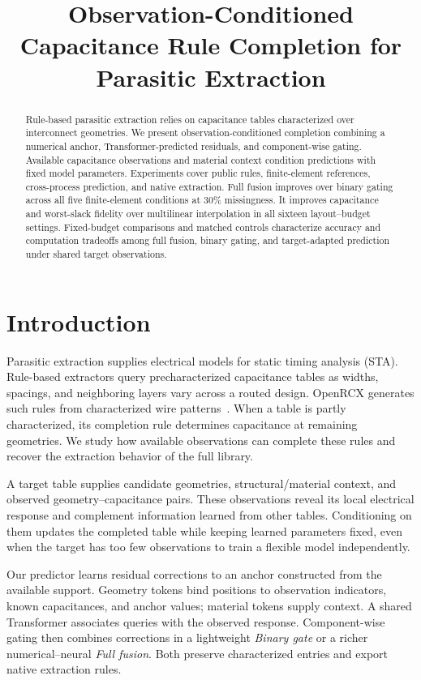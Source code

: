 \documentclass[conference,10pt,letterpaper]{IEEEtran}
\title{Observation-Conditioned Capacitance Rule Completion for Parasitic Extraction}
\author{\IEEEauthorblockN{Anonymous authors}\IEEEauthorblockA{\vphantom{Department and affiliation}\vphantom{City, Country}\\\vphantom{Contact information}}}
\begin{document}
\maketitle
\begin{abstract}
Rule-based parasitic extraction relies on capacitance tables characterized over interconnect geometries. We present observation-conditioned completion combining a numerical anchor, Transformer-predicted residuals, and component-wise gating. Available capacitance observations and material context condition predictions with fixed model parameters. Experiments cover public rules, finite-element references, cross-process prediction, and native extraction. Full fusion improves over binary gating across all five finite-element conditions at 30\% missingness. It improves capacitance and worst-slack fidelity over multilinear interpolation in all sixteen layout--budget settings. Fixed-budget comparisons and matched controls characterize accuracy and computation tradeoffs among full fusion, binary gating, and target-adapted prediction under shared target observations.
\end{abstract}

\section{Introduction}
Parasitic extraction supplies electrical models for static timing analysis (STA). Rule-based extractors query precharacterized capacitance tables as widths, spacings, and neighboring layers vary across a routed design. OpenRCX generates such rules from characterized wire patterns~\cite{openrcx}. When a table is partly characterized, its completion rule determines capacitance at remaining geometries. We study how available observations can complete these rules and recover the extraction behavior of the full library.

A target table supplies candidate geometries, structural/material context, and observed geometry--capacitance pairs. These observations reveal its local electrical response and complement information learned from other tables. Conditioning on them updates the completed table while keeping learned parameters fixed, even when the target has too few observations to train a flexible model independently.

Our predictor learns residual corrections to an anchor constructed from the available support. Geometry tokens bind positions to observation indicators, known capacitances, and anchor values; material tokens supply context. A shared Transformer associates queries with the observed response. Component-wise gating then combines corrections in a lightweight \emph{Binary gate} or a richer numerical--neural \emph{Full fusion}. Both preserve characterized entries and export native extraction rules.
\end{document}
